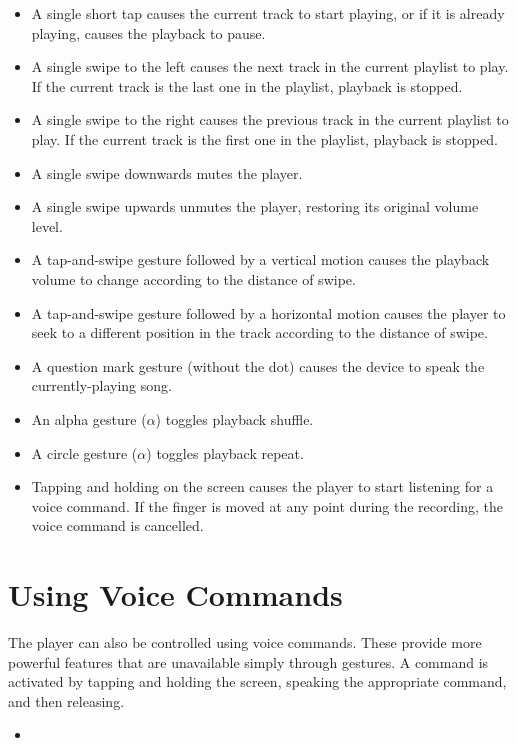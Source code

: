\documentclass[12pt,letterpaper]{article}
\begin{document}
\begin{itemize}
\item A single short tap causes the current track to start playing, or if it is already playing, causes the playback to pause.
\item A single swipe to the left causes the next track in the current playlist to play. If the current track is the last one in the playlist, playback is stopped.
\item A single swipe to the right causes the previous track in the current playlist to play. If the current track is the first one in the playlist, playback is stopped.
\item A single swipe downwards mutes the player.
\item A single swipe upwards unmutes the player, restoring its original volume level.
\item {\color{red} A tap-and-swipe gesture followed by a vertical motion causes the playback volume to change according to the distance of swipe.}
\item {\color{red} A tap-and-swipe gesture followed by a horizontal motion causes the player to seek to a different position in the track according to the distance of swipe.}
\item {\color{red} A question mark gesture (without the dot) causes the device to speak the currently-playing song.}
\item {\color{red} An alpha gesture ($\alpha$) toggles playback shuffle.}
\item {\color{red} A circle gesture ($\alpha$) toggles playback repeat.}
\item Tapping and holding on the screen causes the player to start listening for a voice command. If the finger is moved at any point during the recording, the voice command is cancelled.
\end{itemize}

\section{Using Voice Commands}

The player can also be controlled using voice commands. These provide more powerful features that are unavailable simply through gestures. A command is activated by tapping and holding the screen, speaking the appropriate command, and then releasing.

\begin{itemize}
\item 
\end{itemize}
\end{document}

